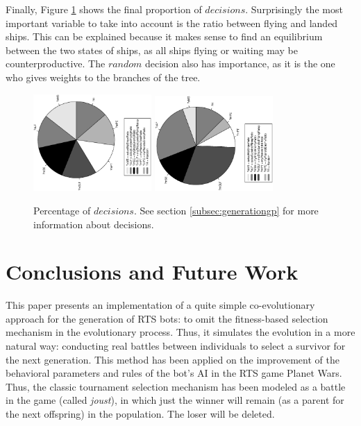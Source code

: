 \documentclass[conference]{IEEEtran}
\begin{document}
Finally, Figure \ref{figura:tarta_decissions} shows the final proportion of $decisions$. Surprisingly the most important variable to take into account is the ratio between flying and landed ships. This can be explained because it makes sense to find an equilibrium between the two states of ships, as all ships flying or waiting may be counterproductive. The $random$ decision also has importance, as it is the one who gives weights to the branches of the tree.
\begin{figure}[htb]
\tiny
\begin{center}


    \includegraphics[trim=1cm 5.5cm 0cm 5.5cm, clip=true,width=4.5cm,angle=-90]{./imags/distribution_initial_condition.eps}
    \includegraphics[trim=1cm 5.5cm 0cm 5.5cm, clip=true,width=4.5cm,angle=-90]{./imags/distribution_final_condition.eps}



\end{center}
\caption{Percentage of $decisions$. See section \ref{subsec:generationgp} for more information about decisions.}
\label{figura:tarta_decissions}
\end{figure}




%
\section{Conclusions and Future Work}
\label{sec:conclusions}

This paper presents an implementation of a quite simple co-evolutionary approach for the generation of RTS bots: to omit the fitness-based selection mechanism in the evolutionary process. Thus, it simulates the evolution in a more natural way: conducting real battles between individuals to select a survivor for the next generation. This method has been applied on the improvement of the behavioral parameters and rules of the bot's AI in the RTS game Planet Wars. 
Thus, the classic tournament selection mechanism has been modeled as a battle in the game (called \textit{joust}), in which just the winner will remain (as a parent for the next offspring) in the population. The loser will be deleted.
\end{document}
